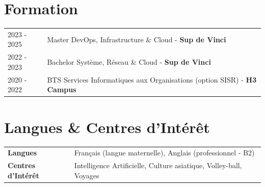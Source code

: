 \documentclass[a4paper,10pt]{article}
\begin{document}
\section{Formation}
\begin{tabularx}{\linewidth}{@{}l X@{}} 
2023 - 2025 & Master DevOps, Infrastructure \& Cloud - \textbf{Sup de Vinci} \\
2022 - 2023 & Bachelor Système, Réseau \& Cloud - \textbf{Sup de Vinci} \\
2020 - 2022 & BTS Services Informatiques aux Organisations (option SISR) - \textbf{H3 Campus} \\
\end{tabularx}

\vspace{3pt}

\section{Langues \& Centres d'Intérêt}
\begin{tabularx}{\linewidth}{@{}l X@{}}
\textbf{Langues} & Français (langue maternelle), Anglais (professionnel - B2)\\
\textbf{Centres d'Intérêt} & Intelligence Artificielle, Culture asiatique, Volley-ball, Voyages\\
\end{tabularx}
\end{document}

